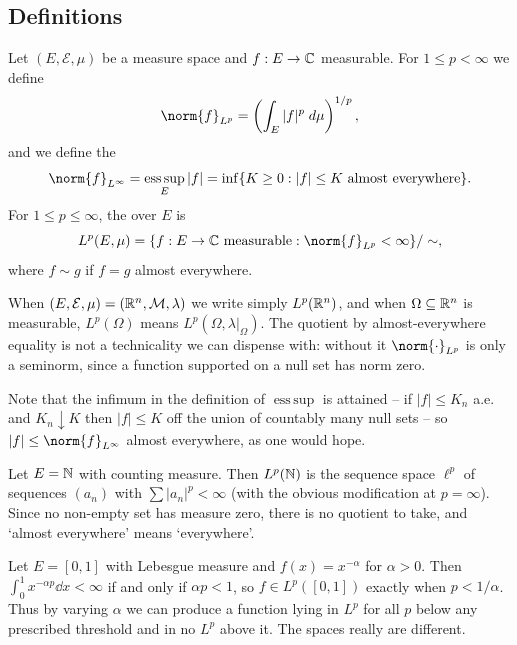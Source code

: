 \documentclass[a4paper]{scrartcl}
\DeclareMathOperator*{\esssup}{ess\,sup}
\begin{document}
\subsection{Definitions}

\begin{definition}[$L^p$ norm]
	Let $(E, \mathcal{E}, \mu)$ be a measure space and $f : E \to \mathbb{C}$ measurable. For $1 \le p < \infty$ we define
	$$\norm{f}_{L^p} = \left( \int_E |f|^p \dd \mu \right)^{1/p},$$
	and we define the 
	$$\norm{f}_{L^\infty} = \esssup_E |f| = \inf\{ K \ge 0 : |f| \le K \text{ almost everywhere}\}.$$
	For $1 \le p \le \infty$, the  over $E$ is
	$$L^p(E, \mu) = \{ f : E \to \C \text{ measurable} : \norm{f}_{L^p} < \infty \} / \sim,$$
	where $f \sim g$ if $f = g$ almost everywhere.
\end{definition}

When $(E, \mathcal{E}, \mu) = (\mathbb{R}^n, \mathcal{M}, \lambda)$ we write simply $L^p(\mathbb{R}^n)$, and when $\Omega \subseteq \mathbb{R}^n$ is measurable, $L^p(\Omega)$ means $L^p(\Omega, \lambda|_\Omega)$. The quotient by almost-everywhere equality is not a technicality we can dispense with: without it $\norm{\cdot}_{L^p}$ is only a seminorm, since a function supported on a null set has norm zero.

Note that the infimum in the definition of $\esssup$ is attained -- if $|f| \le K_n$ a.e. and $K_n \downarrow K$ then $|f| \le K$ off the union of countably many null sets -- so $|f| \le \norm{f}_{L^\infty}$ almost everywhere, as one would hope.

\begin{example}
	Let $E = \mathbb{N}$ with counting measure. Then $L^p(\mathbb{N})$ is the sequence space $\ell^p$ of sequences $(a_n)$ with $\sum |a_n|^p < \infty$ (with the obvious modification at $p = \infty$). Since no non-empty set has measure zero, there is no quotient to take, and `almost everywhere' means `everywhere'.
\end{example}

\begin{example}
	Let $E = [0,1]$ with Lebesgue measure and $f(x) = x^{-\alpha}$ for $\alpha > 0$. Then $\int_0^1 x^{-\alpha p} \dd x < \infty$ if and only if $\alpha p < 1$, so $f \in L^p([0,1])$ exactly when $p < 1/\alpha$. Thus by varying $\alpha$ we can produce a function lying in $L^p$ for all $p$ below any prescribed threshold and in no $L^p$ above it. The spaces really are different.
\end{example}
\end{document}
